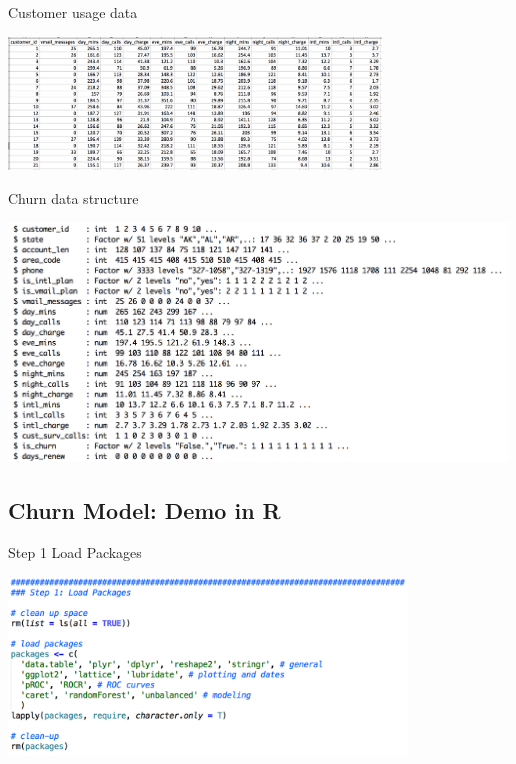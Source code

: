 \documentclass[10pt]{beamer}
\begin{document}
    \begin{frame}{Customer usage data}
        \begin{center}
          \includegraphics[height=100pt]{../graphs/dataset_customer_usage}
        \end{center}
    \end{frame}

    \begin{frame}{Churn data structure}
      \begin{center}
        \includegraphics[height=180pt]{../graphs/dataset_churn_str}
      \end{center}
    \end{frame}

  \subsection{Churn Model: Demo in R}

    \begin{frame}{Step 1 Load Packages}
        \begin{center}
          \includegraphics[width=300pt]{../graphs/demo_r_step_1}
        \end{center}
    \end{frame}
\end{document}
